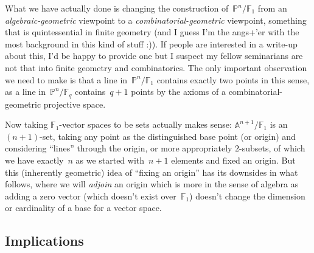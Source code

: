 What we have actually done is changing the construction of~$\mathbb{P}^n/\mathbb{F}_1$ from an \emph{algebraic-geometric} viewpoint to a \emph{combinatorial-geometric} viewpoint, something that is quintessential in finite geometry (and I guess I'm the angs+'er with the most background in this kind of stuff :)). If people are interested in a write-up about this, I'd be happy to provide one but I suspect my fellow seminarians are not that into finite geometry and combinatorics. The only important observation we need to make is that a line in~$\mathbb{P}^n/\mathbb{F}_1$ contains exactly two points in this sense, as a line in~$\mathbb{P}^n/\mathbb{F}_q$ contains~$q+1$ points by the axioms of a combinatorial-geometric projective space.

Now taking $\mathbb{F}_1$-vector spaces to be sets actually makes sense: $\mathbb{A}^{n+1}/\mathbb{F}_1$ is an~$(n+1)$-set, taking any point as the distinguished base point (or origin) and considering ``lines'' through the origin, or more appropriately $2$-subsets, of which we have exactly~$n$ as we started with~$n+1$ elements and fixed an origin. But this (inherently geometric) idea of ``fixing an origin'' has its downsides in what follows, where we will \emph{adjoin} an origin which is more in the sense of algebra as adding a zero vector (which doesn't exist over~$\mathbb{F}_1$) doesn't change the dimension or cardinality of a base for a vector space.

\subsection{Implications}

